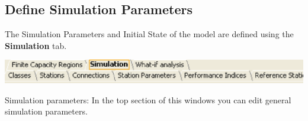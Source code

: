 \subsection{Define Simulation Parameters}
\label{sec:DefineSimulationParameters}
The Simulation Parameters and Initial State of the model are defined using the \textbf{Simulation} tab.
\begin{center}
\includegraphics[scale=.5]{img/jsim/sim_tabs.eps}
\end{center}
\begin{description*}
\item [Simulation parameters:] In the top section of this windows
you can edit general simulation parameters.
\begin{figure}
\begin{center}
\end{center}
\end{figure}


\end{description*}
